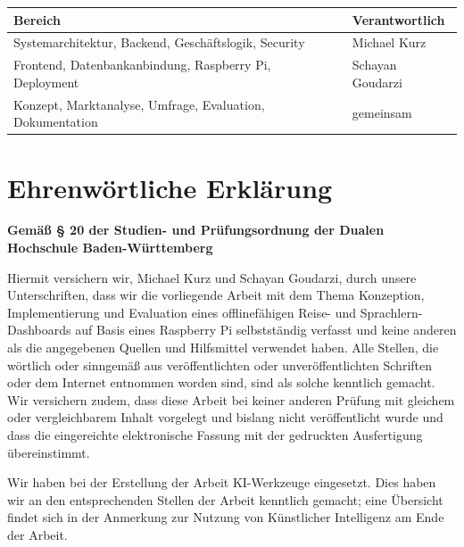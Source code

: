\documentclass[12pt,a4paper]{scrreprt}
\begin{document}
\vspace{0.5cm}
\begin{tabular}{ll}
    \toprule
    Bereich & Verantwortlich \\
    \midrule
    Systemarchitektur, Backend, Geschäftslogik, Security & Michael Kurz \\
    Frontend, Datenbankanbindung, Raspberry Pi, Deployment & Schayan Goudarzi \\
    Konzept, Marktanalyse, Umfrage, Evaluation, Dokumentation & gemeinsam \\
    \bottomrule
\end{tabular}

\clearpage
\chapter*{Ehrenwörtliche Erklärung}

\vspace{0.5cm}

\noindent
\textbf{Gemäß § 20 der Studien- und Prüfungsordnung der Dualen Hochschule Baden-Württemberg}

\par\vspace{0.8cm}

\noindent
Hiermit versichern wir, Michael Kurz und Schayan Goudarzi, durch unsere Unterschriften, dass wir die vorliegende Arbeit mit dem Thema \glqq Konzeption, Implementierung und Evaluation eines offlinefähigen Reise- und Sprachlern-Dashboards auf Basis eines Raspberry Pi\grqq{} selbstständig verfasst und keine anderen als die angegebenen Quellen und Hilfsmittel verwendet haben. Alle Stellen, die wörtlich oder sinngemäß aus veröffentlichten oder unveröffentlichten Schriften oder dem Internet entnommen worden sind, sind als solche kenntlich gemacht. Wir versichern zudem, dass diese Arbeit bei keiner anderen Prüfung mit gleichem oder vergleichbarem Inhalt vorgelegt und bislang nicht veröffentlicht wurde und dass die eingereichte elektronische Fassung mit der gedruckten Ausfertigung übereinstimmt.

\vspace{0.5cm}
\noindent Wir haben bei der Erstellung der Arbeit KI-Werkzeuge eingesetzt. Dies haben wir an den entsprechenden Stellen der Arbeit kenntlich gemacht; eine Übersicht findet sich in der Anmerkung zur Nutzung von Künstlicher Intelligenz am Ende der Arbeit.
\end{document}
